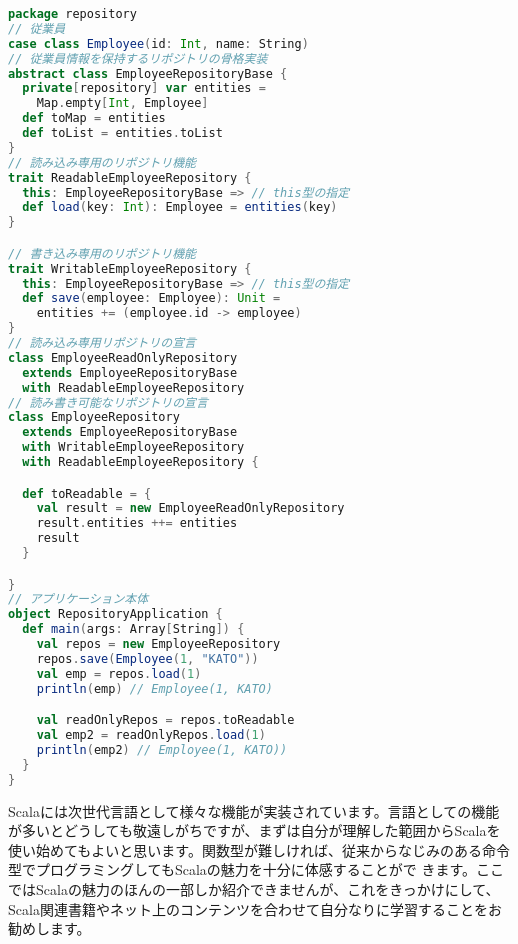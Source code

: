 \begin{lstlisting}[language=scala, label=src:trait_mixin, caption=複数のトレイトを使ったミックスインの例]
package repository
// 従業員
case class Employee(id: Int, name: String)
// 従業員情報を保持するリポジトリの骨格実装
abstract class EmployeeRepositoryBase {
  private[repository] var entities =
    Map.empty[Int, Employee]
  def toMap = entities
  def toList = entities.toList
}
// 読み込み専用のリポジトリ機能
trait ReadableEmployeeRepository {
  this: EmployeeRepositoryBase => // this型の指定
  def load(key: Int): Employee = entities(key)
}

// 書き込み専用のリポジトリ機能
trait WritableEmployeeRepository {
  this: EmployeeRepositoryBase => // this型の指定
  def save(employee: Employee): Unit =
    entities += (employee.id -> employee)
}
// 読み込み専用リポジトリの宣言
class EmployeeReadOnlyRepository
  extends EmployeeRepositoryBase
  with ReadableEmployeeRepository
// 読み書き可能なリポジトリの宣言
class EmployeeRepository
  extends EmployeeRepositoryBase
  with WritableEmployeeRepository
  with ReadableEmployeeRepository {

  def toReadable = {
    val result = new EmployeeReadOnlyRepository
    result.entities ++= entities
    result
  }

}
// アプリケーション本体
object RepositoryApplication {
  def main(args: Array[String]) {
    val repos = new EmployeeRepository
    repos.save(Employee(1, "KATO"))
    val emp = repos.load(1)
    println(emp) // Employee(1, KATO)

    val readOnlyRepos = repos.toReadable
    val emp2 = readOnlyRepos.load(1)
    println(emp2) // Employee(1, KATO))
  }
}
\end{lstlisting}

Scalaには次世代言語として様々な機能が実装されています。言語としての機能が多いとどうしても敬遠しがちですが、まずは自分が理解した範囲からScalaを使い始めてもよいと思います。関数型が難しければ、従来からなじみのある命令型でプログラミングしてもScalaの魅力を十分に体感することがで きます。ここではScalaの魅力のほんの一部しか紹介できませんが、これをきっかけにして、Scala関連書籍やネット上のコンテンツを合わせて自分なりに学習することをお勧めします。
